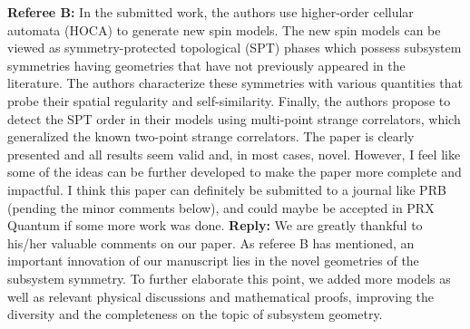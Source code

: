 \documentclass{article}
\begin{document}
\begin{tcolorbox}[title=Reply 4 (general reply),breakable, colframe=blue]
\textbf{Referee B:} In the submitted work, the authors use higher-order cellular automata
(HOCA) to generate new spin models. The new spin models can be viewed
as symmetry-protected topological (SPT) phases which possess subsystem
symmetries {\color{red}having geometries that have not previously appeared in the
literature}. The authors characterize these symmetries with various
quantities that probe their spatial regularity and self-similarity.
Finally, the authors propose to detect the SPT order in their models
using multi-point strange correlators, which generalized the known
two-point strange correlators.
The paper is {\color{red}  clearly presented and all results seem valid and, in most
cases, novel.} However, I feel like some of the ideas can be further
developed to make the paper more complete and impactful. I think this
paper can definitely be submitted to a journal like PRB (pending the
minor comments below), and could maybe be accepted in PRX Quantum if
some more work was done. 
\tcblower
\textbf{Reply:} We are greatly thankful to his/her valuable comments on our paper. As referee B has mentioned, an important innovation of our manuscript lies in the novel geometries of the subsystem symmetry. To further elaborate this point, we added more models as well as relevant physical discussions and mathematical proofs, improving the diversity and the completeness on the topic of subsystem geometry. %



\end{tcolorbox}
\end{document}
